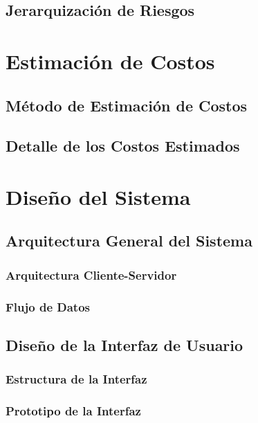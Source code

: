 \subsection{Jerarquización de Riesgos}

\section{Estimación de Costos}
\subsection{Método de Estimación de Costos}
\subsection{Detalle de los Costos Estimados}

\section{Diseño del Sistema}
\subsection{Arquitectura General del Sistema}
\subsubsection{Arquitectura Cliente-Servidor}
\subsubsection{Flujo de Datos}

\subsection{Diseño de la Interfaz de Usuario}
\subsubsection{Estructura de la Interfaz}
\subsubsection{Prototipo de la Interfaz}
